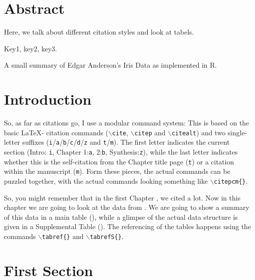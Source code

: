 \section*{Abstract}
\noindent
Here, we talk about different citation styles and look at tabels.

 Key1, key2, key3.

\begin{multicols}{2}

\begin{table*}[!htb]
\centering
\caption[Summary of Anderson's Iris Data]{\label{tab:c2t1}
A small summary of Edgar Anderson's Iris Data as implemented in R.}
\begin{small}

\end{small}
\end{table*}

\section{Introduction}

So, as far as citations go, I use a modular command system: This is based on the basic \LaTeX - citation commands (\texttt{$\backslash$cite}, \texttt{$\backslash$citep} and \texttt{$\backslash$citealt}) and two single-letter suffixes (\texttt{i}/\texttt{a}/\texttt{b}/\texttt{c}/\texttt{d}/\texttt{z} and \texttt{t}/\texttt{m}). The first letter indicates the current section (Intro: \texttt{i}, Chapter 1:\texttt{a}, 2:\texttt{b}, Synthesis:\texttt{z}), while the last letter indicates whether this is the self-citation from the Chapter title page (\texttt{t}) or a citation within the manuscript (\texttt{m}).
Form these pieces, the actual commands can be puzzled together, with the actual commands looking something like \texttt{$\backslash$citepcm\{\}}.

So, you might remember that in the first Chapter , we cited  a lot.
Now in this chapter we are going to look at the data from .
We are going to show a summary of this data in a main table (), while a glimpse of the actual data structure is given in a Supplemental Table ().
The referencing of the tables happens using the commands \texttt{$\backslash$tabref\{\}} and \texttt{$\backslash$tabrefS\{\}}.

\section{First Section}
\lipsum[7-8]


\end{multicols}
